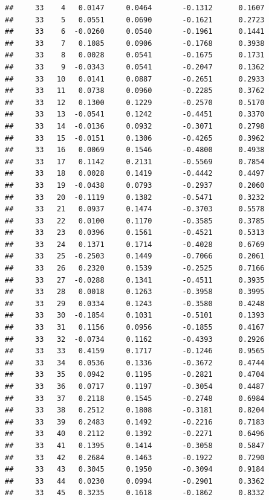 \documentclass[
]{article}
\begin{document}
\begin{verbatim}
##     33    4   0.0147     0.0464       -0.1312      0.1607  
##     33    5   0.0551     0.0690       -0.1621      0.2723  
##     33    6  -0.0260     0.0540       -0.1961      0.1441  
##     33    7   0.1085     0.0906       -0.1768      0.3938  
##     33    8   0.0028     0.0541       -0.1675      0.1731  
##     33    9  -0.0343     0.0541       -0.2047      0.1362  
##     33   10   0.0141     0.0887       -0.2651      0.2933  
##     33   11   0.0738     0.0960       -0.2285      0.3762  
##     33   12   0.1300     0.1229       -0.2570      0.5170  
##     33   13  -0.0541     0.1242       -0.4451      0.3370  
##     33   14  -0.0136     0.0932       -0.3071      0.2798  
##     33   15  -0.0151     0.1306       -0.4265      0.3962  
##     33   16   0.0069     0.1546       -0.4800      0.4938  
##     33   17   0.1142     0.2131       -0.5569      0.7854  
##     33   18   0.0028     0.1419       -0.4442      0.4497  
##     33   19  -0.0438     0.0793       -0.2937      0.2060  
##     33   20  -0.1119     0.1382       -0.5471      0.3232  
##     33   21   0.0937     0.1474       -0.3703      0.5578  
##     33   22   0.0100     0.1170       -0.3585      0.3785  
##     33   23   0.0396     0.1561       -0.4521      0.5313  
##     33   24   0.1371     0.1714       -0.4028      0.6769  
##     33   25  -0.2503     0.1449       -0.7066      0.2061  
##     33   26   0.2320     0.1539       -0.2525      0.7166  
##     33   27  -0.0288     0.1341       -0.4511      0.3935  
##     33   28   0.0018     0.1263       -0.3958      0.3995  
##     33   29   0.0334     0.1243       -0.3580      0.4248  
##     33   30  -0.1854     0.1031       -0.5101      0.1393  
##     33   31   0.1156     0.0956       -0.1855      0.4167  
##     33   32  -0.0734     0.1162       -0.4393      0.2926  
##     33   33   0.4159     0.1717       -0.1246      0.9565  
##     33   34   0.0536     0.1336       -0.3672      0.4744  
##     33   35   0.0942     0.1195       -0.2821      0.4704  
##     33   36   0.0717     0.1197       -0.3054      0.4487  
##     33   37   0.2118     0.1545       -0.2748      0.6984  
##     33   38   0.2512     0.1808       -0.3181      0.8204  
##     33   39   0.2483     0.1492       -0.2216      0.7183  
##     33   40   0.2112     0.1392       -0.2271      0.6496  
##     33   41   0.1395     0.1414       -0.3058      0.5847  
##     33   42   0.2684     0.1463       -0.1922      0.7290  
##     33   43   0.3045     0.1950       -0.3094      0.9184  
##     33   44   0.0230     0.0994       -0.2901      0.3362  
##     33   45   0.3235     0.1618       -0.1862      0.8332  

\end{verbatim}
\end{document}
